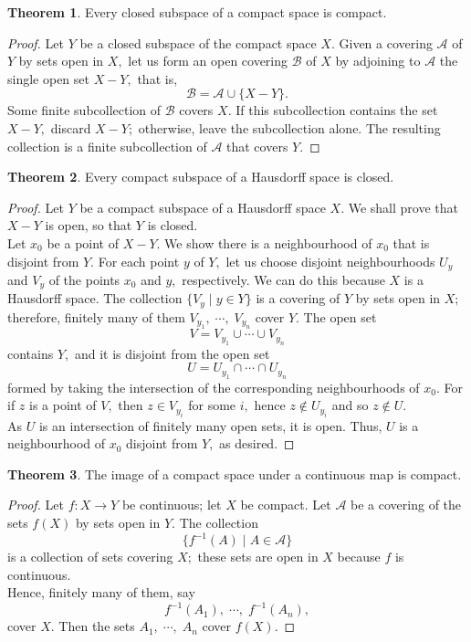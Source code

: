 \documentclass{article}
\theoremstyle{definition}
\newtheorem{theorem}{Theorem}[section]
\begin{document}
%
\begin{theorem}\label{thm:compact closed}
  Every closed subspace of a compact space is compact.
\end{theorem}
\begin{proof}
  Let $Y$ be a closed subspace of the compact space $X.$ Given a covering $\mathcal{A}$ of $Y$ by sets open in $X,$ let us form an open covering $\mathcal{B}$ of $X$ by adjoining to $\mathcal{A}$ the single open set $X-Y,$ that is,
  \[\mathcal{B} = \mathcal{A} \cup \{X - Y\}.\]
  Some finite subcollection of $\mathcal{B}$ covers $X.$ If this subcollection contains the set $X-Y,$ discard $X-Y;$ otherwise, leave the subcollection alone. The resulting collection is a finite subcollection of $\mathcal{A}$ that covers $Y.$
\end{proof}
%
\begin{theorem}\label{thm:compact haus}
  Every compact subspace of a Hausdorff space is closed.
\end{theorem}
\begin{proof}
  Let $Y$ be a compact subspace of a Hausdorff space $X.$ We shall prove that $X-Y$ is open, so that $Y$ is closed.\\
  Let $x_0$ be a point of $X-Y.$ We show there is a neighbourhood of $x_0$ that is disjoint from $Y.$ For each point $y$ of $Y,$ let us choose disjoint neighbourhoods $U_y$ and $V_y$ of the points $x_0$ and $y,$ respectively. We can do this because $X$ is a Hausdorff space. The collection $\{V_y\;|\;y \in Y\}$ is a covering of $Y$ by sets open in $X;$ therefore, finitely many of them $V_{y_1},\;\cdots,\;V_{y_n}$ cover $Y.$ The open set
  \[V = V_{y_1} \cup \cdots \cup V_{y_n}\]
  contains $Y,$ and it is disjoint from the open set 
  \[U = U_{y_1} \cap \cdots \cap U_{y_n}\]
  formed by taking the intersection of the corresponding neighbourhoods of $x_0.$ For if $z$ is a point of $V,$ then $z \in V_{y_i}$ for some $i,$ hence $z \not\in U_{y_i}$ and so $z \not\in U.$\\
  As $U$ is an intersection of finitely many open sets, it is open. Thus, $U$ is a neighbourhood of $x_0$ disjoint from $Y,$ as desired.
\end{proof}
%
\begin{theorem}
  The image of a compact space under a continuous map is compact.
\end{theorem}
\begin{proof}
  Let $f:X\longrightarrow Y$ be continuous; let $X$ be compact. Let $\mathcal{A}$ be a covering of the sets $f(X)$ by sets open in $Y.$ The collection
  \[\{f^{-1}(A)\;|\;A\in\mathcal{A}\}\]
  is a collection of sets covering $X;$ these sets are open in $X$ because $f$ is continuous. \\
  Hence, finitely many of them, say
  \[f^{-1}\left(A_{1}\right),\; \cdots,\; f^{-1}\left(A_{n}\right),\]
  cover $X.$ Then the sets $A_1,\;\cdots,\;A_n$ cover $f(X).$
\end{proof}
\end{document}
